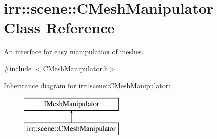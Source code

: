\hypertarget{classirr_1_1scene_1_1_c_mesh_manipulator}{\section{irr\-:\-:scene\-:\-:C\-Mesh\-Manipulator Class Reference}
\label{classirr_1_1scene_1_1_c_mesh_manipulator}
}


An interface for easy manipulation of meshes.  




{\ttfamily \#include $<$C\-Mesh\-Manipulator.\-h$>$}

Inheritance diagram for irr\-:\-:scene\-:\-:C\-Mesh\-Manipulator\-:\begin{figure}[H]
\begin{center}
\leavevmode
\includegraphics[height=2.000000cm]{classirr_1_1scene_1_1_c_mesh_manipulator}
\end{center}
\end{figure}
